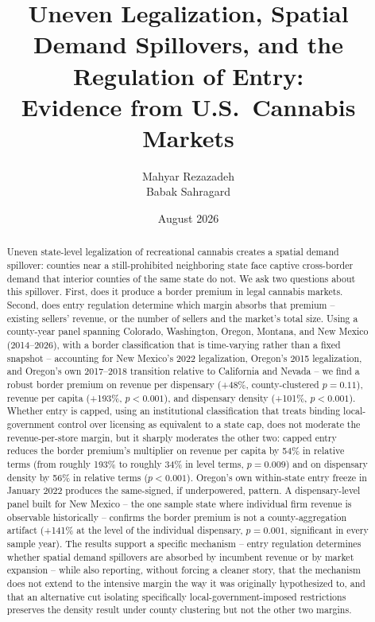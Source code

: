 \documentclass[12pt]{article}
\title{Uneven Legalization, Spatial Demand Spillovers, and the Regulation of Entry:\\
Evidence from U.S.\ Cannabis Markets}
\author{Mahyar Rezazadeh \\ Babak Sahragard}
\date{August 2026}
\begin{document}
\maketitle

\begin{abstract}
\noindent Uneven state-level legalization of recreational cannabis creates a spatial demand spillover: counties
near a still-prohibited neighboring state face captive cross-border demand that interior counties of the same
state do not. We ask two questions about this spillover. First, does it produce a border premium in legal
cannabis markets. Second, does entry regulation determine which margin absorbs that premium -- existing
sellers' revenue, or the number of sellers and the market's total size. Using a county-year panel spanning
Colorado, Washington, Oregon, Montana, and New Mexico (2014--2026), with a border classification that is
time-varying rather than a fixed snapshot -- accounting for New Mexico's 2022 legalization, Oregon's 2015
legalization, and Oregon's own 2017--2018 transition relative to California and Nevada -- we find a robust
border premium on revenue per dispensary (+48\%, county-clustered $p=0.11$), revenue per capita (+193\%,
$p<0.001$), and dispensary density (+101\%, $p<0.001$). Whether entry is capped, using an institutional
classification that treats binding local-government control over licensing as equivalent to a state cap, does
not moderate the revenue-per-store margin, but it sharply moderates the other two: capped entry reduces the
border premium's multiplier on revenue per capita by 54\% in relative terms (from roughly 193\% to roughly
34\% in level terms, $p=0.009$) and on dispensary density by 56\% in relative terms ($p<0.001$). Oregon's own
within-state entry freeze in January 2022 produces the same-signed, if
underpowered, pattern. A dispensary-level panel built for New Mexico -- the one sample state where individual
firm revenue is observable historically -- confirms the border premium is not a county-aggregation artifact
(+141\% at the level of the individual dispensary, $p=0.001$, significant in every sample year). The results
support a specific mechanism -- entry regulation determines whether spatial
demand spillovers are absorbed by incumbent revenue or by market expansion -- while also reporting, without
forcing a cleaner story, that the mechanism does not extend to the intensive margin the way it was originally
hypothesized to, and that an alternative cut isolating specifically local-government-imposed restrictions
preserves the density result under county clustering but not the other two margins.
\end{abstract}
\end{document}
